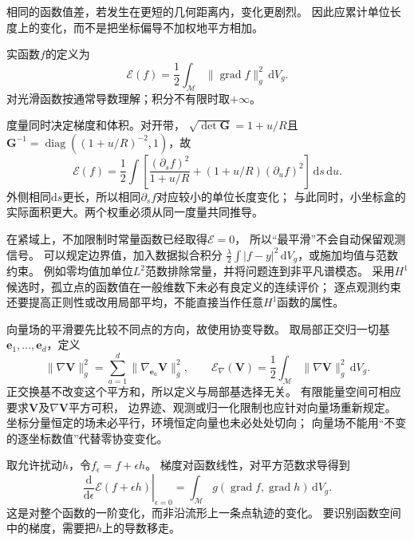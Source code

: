 相同的函数值差，若发生在更短的几何距离内，变化更剧烈。
因此应累计单位长度上的变化，而不是把坐标偏导不加权地平方相加。
\begin{definition}[Dirichlet能量]
\label{def:geometry-dirichlet-energy}
实函数$f$的定义为
\begin{equation}
 \mathcal E(f)=\frac12\int_{\mathcal M}
       \lVert\operatorname{grad}f\rVert_g^2\,\mathrm dV_g.
 \label{eq:geometry-dirichlet-energy}
\end{equation}
对光滑函数按通常导数理解；积分不有限时取$+\infty$。
\end{definition}
度量同时决定梯度和体积。对开带，
$\sqrt{\det\bm G}=1+u/R$且
$\bm G^{-1}=\operatorname{diag}((1+u/R)^{-2},1)$，故
\begin{equation}
 \mathcal E(f)=\frac12\int
 \left[\frac{(\partial_sf)^2}{1+u/R}
       +(1+u/R)(\partial_uf)^2\right]\,\mathrm ds\,\mathrm du.
 \label{eq:geometry-strip-dirichlet-energy}
\end{equation}
外侧相同$\mathrm ds$更长，所以相同$\partial_sf$对应较小的单位长度变化；
与此同时，小坐标盒的实际面积更大。两个权重必须从同一度量共同推导。


在紧域上，不加限制时常量函数已经取得$\mathcal E=0$，
所以“最平滑”不会自动保留观测信号。
可以规定边界值，加入数据拟合积分
$\frac{\lambda}{2}\int|f-y|^2\,\mathrm dV_g$，或施加均值与范数约束。
例如零均值加单位$L^2$范数排除常量，并将问题连到非平凡谱模态。
采用$H^1$候选时，孤立点的函数值在一般维数下未必有良定义的连续评价；
逐点观测约束还要提高正则性或改用局部平均，不能直接当作任意$H^1$函数的属性。

向量场的平滑要先比较不同点的方向，故使用协变导数。
取局部正交归一切基$\bm e_1,\ldots,\bm e_d$，定义
\[
 \lVert\nabla\bm V\rVert_g^2
 =\sum_{a=1}^d\lVert\nabla_{\bm e_a}\bm V\rVert_g^2,\qquad
 \mathcal E_\nabla(\bm V)
 =\frac12\int_{\mathcal M}\lVert\nabla\bm V\rVert_g^2\,\mathrm dV_g.
\]
正交换基不改变这个平方和，所以定义与局部基选择无关。
有限能量空间可相应要求$\bm V$及$\nabla\bm V$平方可积，
边界迹、观测或归一化限制也应针对向量场重新规定。
坐标分量恒定的场未必平行，环境恒定向量也未必处处切向；
向量场不能用“不变的逐坐标数值”代替零协变变化。


取允许扰动$h$，令$f_\epsilon=f+\epsilon h$。
梯度对函数线性，对平方范数求导得到
\begin{equation}
 \left.\frac{\mathrm d}{\mathrm d\epsilon}
  \mathcal E(f+\epsilon h)\right|_{\epsilon=0}
 =\int_{\mathcal M}
    g(\operatorname{grad}f,\operatorname{grad}h)\,\mathrm dV_g.
 \label{eq:geometry-dirichlet-first-variation}
\end{equation}
这是对整个函数的一阶变化，而非沿流形上一条点轨迹的变化。
要识别函数空间中的梯度，需要把$h$上的导数移走。


